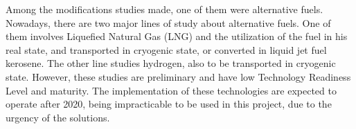 Among the modifications studies made, one of them were alternative fuels. Nowadays, there are two major lines of study  about alternative fuels. One of them involves Liquefied Natural Gas (LNG) \cite{Wald} and the utilization of the fuel in his real state, and transported in cryogenic state, or converted in liquid jet fuel kerosene. The other line studies hydrogen, also to be transported in cryogenic state. However, these studies are preliminary and have low Technology Readiness Level and maturity. The implementation of these technologies are expected to operate after 2020, being impracticable to be used in this project, due to the urgency of the solutions. 
